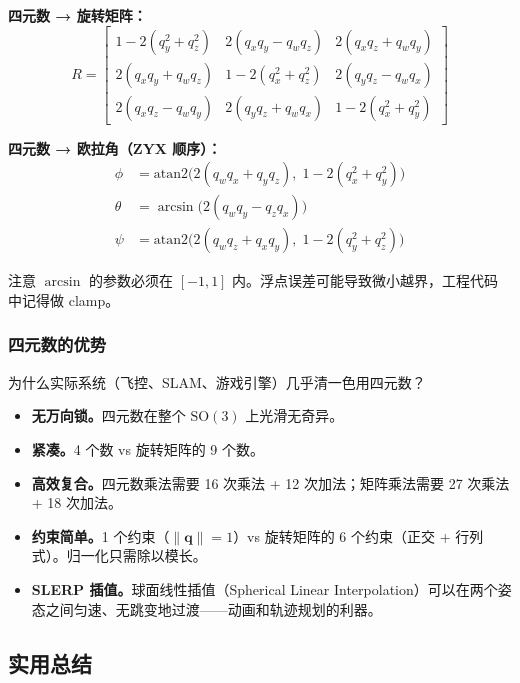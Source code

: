 \textbf{四元数 → 旋转矩阵：}
\begin{equation}
R = \begin{bmatrix}
1 - 2(q_y^2 + q_z^2) & 2(q_x q_y - q_w q_z) & 2(q_x q_z + q_w q_y) \\
2(q_x q_y + q_w q_z) & 1 - 2(q_x^2 + q_z^2) & 2(q_y q_z - q_w q_x) \\
2(q_x q_z - q_w q_y) & 2(q_y q_z + q_w q_x) & 1 - 2(q_x^2 + q_y^2)
\end{bmatrix}
\end{equation}

\textbf{四元数 → 欧拉角（ZYX 顺序）：}
\begin{align}
\phi &= \mathrm{atan2}\!\big(2(q_w q_x + q_y q_z),\; 1 - 2(q_x^2 + q_y^2)\big) \\
\theta &= \arcsin\!\big(2(q_w q_y - q_z q_x)\big) \\
\psi &= \mathrm{atan2}\!\big(2(q_w q_z + q_x q_y),\; 1 - 2(q_y^2 + q_z^2)\big)
\end{align}

注意 $\arcsin$ 的参数必须在 $[-1, 1]$ 内。浮点误差可能导致微小越界，工程代码中记得做 clamp。

\subsubsection{四元数的优势}

为什么实际系统（飞控、SLAM、游戏引擎）几乎清一色用四元数？

\begin{itemize}
    \item \textbf{无万向锁。}四元数在整个 $\mathrm{SO}(3)$ 上光滑无奇异。
    \item \textbf{紧凑。}4 个数 vs 旋转矩阵的 9 个数。
    \item \textbf{高效复合。}四元数乘法需要 16 次乘法 + 12 次加法；矩阵乘法需要 27 次乘法 + 18 次加法。
    \item \textbf{约束简单。}1 个约束（$\|\mathbf{q}\| = 1$）vs 旋转矩阵的 6 个约束（正交 + 行列式）。归一化只需除以模长。
    \item \textbf{SLERP 插值。}球面线性插值（Spherical Linear Interpolation）可以在两个姿态之间匀速、无跳变地过渡——动画和轨迹规划的利器。
\end{itemize}

\subsection{实用总结}

